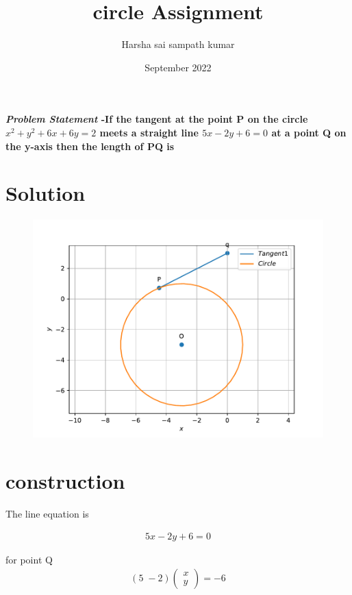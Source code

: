 \documentclass[journal,10pt,twocolumn]{article}
\title{\textbf{circle Assignment}}
\author{Harsha sai sampath kumar}
\date{September 2022}
\newcommand{\myvec}[1]{\ensuremath{\begin{pmatrix}#1\end{pmatrix}}}
\begin{document}
\maketitle
\paragraph{\textit{\large Problem Statement} -If the tangent at the point P  on the circle $x^2+y^2+6x+6y=2$ meets a straight line $5x-2y+6=0$         at a point Q on the y-axis then the length of PQ is }

\section*{\large Solution}

\begin{figure}[H]
\centering
\includegraphics[width=1\columnwidth]{fig}
\caption{}
\end{figure}
\section*{construction}









The line equation is


\begin{align}
5x-2y+6=0
\end{align}

for point Q
\begin{eqnarray}
{(5 \;-2)}
\myvec{x\\y}=-6
\end{eqnarray}
\end{document}
